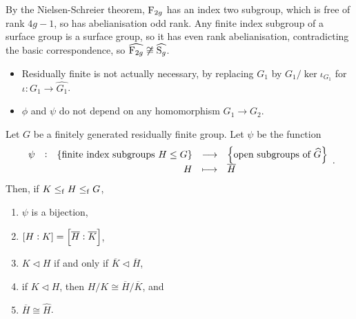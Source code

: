 By the Nielsen-Schreier theorem, $ \mathrm{F}_{2g} $ has an index two subgroup, which is free of rank $ 4g - 1 $, so has abelianisation odd rank. Any finite index subgroup of a surface group is a surface group, so it has even rank abelianisation, contradicting the basic correspondence, so $ \widehat{\mathrm{F}_{2g}} \not\cong \widehat{\mathrm{S}_g} $.


\begin{remark}
\hfill
\begin{itemize}
\item Residually finite is not actually necessary, by replacing $ G_1 $ by $ G_1 / \ker \iota_{G_1} $ for $ \iota : G_1 \to \widehat{G_1} $.
\item $ \phi $ and $ \psi $ do not depend on any homomorphism $ G_1 \to G_2 $.
\end{itemize}
\end{remark}

\begin{proposition}
Let $ G $ be a finitely generated residually finite group. Let $ \psi $ be the function
$$ \function[\psi]{\cbr{\text{finite index subgroups} \ H \le G}}{\cbr{\text{open subgroups of} \ \widehat{G}}}{H}{\overline{H}}. $$
Then, if $ K \le_{\mathrm{f}} H \le_{\mathrm{f}} G $,
\begin{enumerate}
\item $ \psi $ is a bijection,
\item $ \sbr{H : K} = \sbr{\overline{H} : \overline{K}} $,
\item $ K \triangleleft H $ if and only if $ \overline{K} \triangleleft \overline{H} $,
\item if $ K \triangleleft H $, then $ H / K \cong \overline{H} / \overline{K} $, and
\item $ \overline{H} \cong \widehat{H} $.
\end{enumerate}
\end{proposition}

